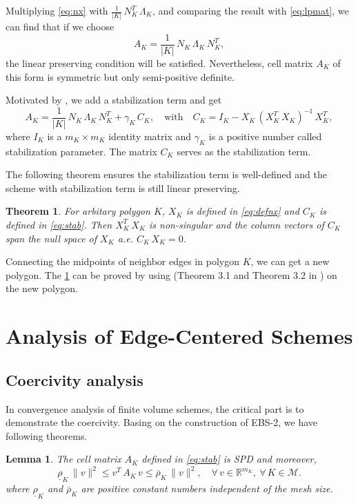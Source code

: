 \documentclass[times,review,preprint,authoryear]{elsarticle}
\newtheorem{theorem}{Theorem}
\newtheorem{lemma}{Lemma}
\newcommand{\Rnum}{\mathbb{R}}
\begin{document}
Multiplying \cref{eq:nx} with $\frac{1}{|K|} \, N_K^T \, \Lambda_K$, and comparing the result with \cref{eq:lpmat}, we can find that if we choose
\begin{equation*}
A_K = \frac{1}{|K|} \, N_K \, \Lambda_K \, N_K^T,
\end{equation*}
the linear preserving condition will be satisfied. Nevertheless, cell matrix $A_K$ of this form is symmetric but only semi-positive definite.

Motivated by \cite{dong_analysis_2020}, we add a stabilization term and get
\begin{equation}\label{eq:stab}
A_K = \frac{1}{|K|} \, N_K \, \Lambda_K \, N_K^T + \gamma_K \, C_K, \quad \text{with} \quad C_K = I_K - X_K \, (X_K^T \, X_K)^{-1} \, X_K^T,
\end{equation}
where $I_K$ is a $m_K \times m_K$ identity matrix and $\gamma_K$ is a positive number called stabilization parameter. The matrix $C_K$ serves as the stabilization term.

The following theorem ensures the stabilization term is well-defined and the scheme with stabilization term is still linear preserving.

\begin{theorem}\label{thm:X}
For arbitary polygon $K$, $X_K$ is defined in \cref{eq:defnx} and $C_K$ is defined in \cref{eq:stab}. Then $X_K^T \, X_K$ is non-singular and the column vectors of $C_K$ span the null space of $X_K$ a.e. $C_K \, X_K = 0$.
\end{theorem}

Connecting the midpoints of neighbor edges in polygon $K$, we can get a new polygon. The \cref{thm:X} can be proved by using (Theorem 3.1 and Theorem 3.2 in \cite{dong_analysis_2020}) on the new polygon.

\section{Analysis of Edge-Centered Schemes}\label{sec4}

\subsection{Coercivity analysis}

In convergence analysis of finite volume schemes, the critical part is to demonstrate the coercivity. Basing on the construction of EBS-2, we have following theorems.

\begin{lemma}\label{lemma:SPD}
The cell matrix $A_K$ defined in \cref{eq:stab} is SPD and moreover,
\begin{equation}
\underline{\rho}_{K} \, \|v\|^2 \leq v^T \, A_{K} \, v \leq \overline{\rho}_{K} \, \|v\|^2, \quad \forall \, v \in \Rnum^{m_K}, \ \forall \, K \in \mathcal{M}.
\end{equation}
where $\underline{\rho}_{K}$ and $\overline{\rho}_{K}$ are positive constant numbers independent of the mesh size.
\end{lemma}
\end{document}
